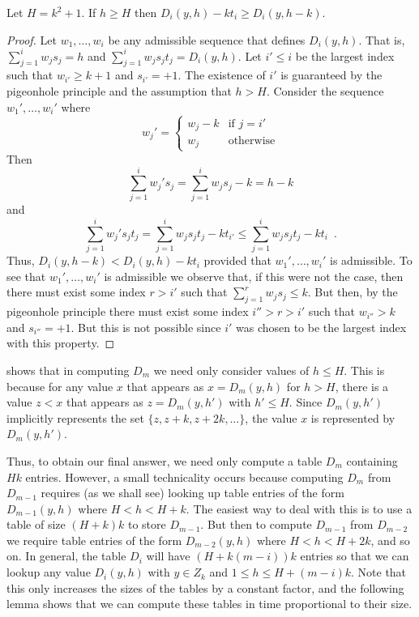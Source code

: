 \documentclass[lotsofwhite]{patmorin}
\begin{document}
\begin{lem}
Let $H=k^2+1$.  If $h\ge H$ then $D_i(y,h) - kt_i \ge D_i(y,h-k)$.
\end{lem}

\begin{proof}
Let $w_1,\ldots,w_i$ be any admissible sequence that defines
$D_i(y,h)$.  That is,  $\sum_{j=1}^iw_js_j = h$ and $\sum_{j=1}^i w_js_jt_j
= D_i(y,h)$.  Let $i'\le i$ be the largest index such that
$w_{i'}\ge k+1$ and $s_{i'}=+1$.  The existence of $i'$ is guaranteed
by the pigeonhole principle and the
assumption that $h>H$.  Consider the sequence $w_1',\ldots,w_i'$ where
\[
     w_j' = \left\{ \begin{array}{ll}
            w_j-k & \mbox{if $j=i'$} \\
            w_j & \mbox{otherwise}  \end{array} \right.
\]
Then
\[
  \sum_{j=1}^i w_j's_j = \sum_{j=1}^i w_js_j - k = h-k
\]
and
\[
   \sum_{j=1}^i w_j's_jt_j = \sum_{j=1}^i w_js_jt_j - kt_{i'} 
    \le \sum_{j=1}^i w_js_jt_j - kt_{i} \enspace . 
\]
Thus, $D_i(y,h-k) < D_i(y,h) - kt_i$ provided that $w_1',\ldots,w_i'$
is admissible.  To see that $w_1',\ldots,w_i'$ is admissible we
observe that, if this were not the case, then there must exist some
index $r>i'$ such that $\sum_{j=1}^r w_js_j \le k$.  But then, by the
pigeonhole principle there
must exist some index $i''>r>i'$ such that $w_{i''}>k$ and
$s_{i''}=+1$.  But this is not possible since $i'$ was chosen to be
the largest index with this property.
\end{proof}

 shows that in computing $D_m$ we need only consider
values of $h\le H$.  This is because for any value $x$ that appears as
$x=D_m(y,h)$ for $h>H$, there is a value $z< x$ that appears as
$z=D_m(y,h')$ with $h'\le H$.  Since $D_m(y,h')$ implicitly represents the
set $\{z, z+k, z+2k,\ldots\}$, the value $x$ is represented by
$D_m(y,h')$.

Thus, to obtain our final answer, we need only compute a
table $D_m$ containing $Hk$ entries.  However, a small technicality
occurs because computing $D_m$ from $D_{m-1}$ requires (as we shall
see) looking up table entries of the form $D_{m-1}(y,h)$ where
$H<h<H+k$.  The easiest way to deal with this is to use a table of
size $(H+k)k$ to store $D_{m-1}$.  But then to compute $D_{m-1}$ from
$D_{m-2}$ we require table entries of the form $D_{m-2}(y,h)$ where
$H<h<H+2k$, and so on.  In general, the table $D_i$ will have
$(H+k(m-i))k$ entries so that we can lookup any value $D_i(y,h)$ with
$y\in Z_k$ and $1\le h\le H+(m-i)k$.  Note that this only increases
the sizes of the tables by a constant factor, and the following lemma
shows that we can compute these tables in time proportional to their
size.
\end{document}
